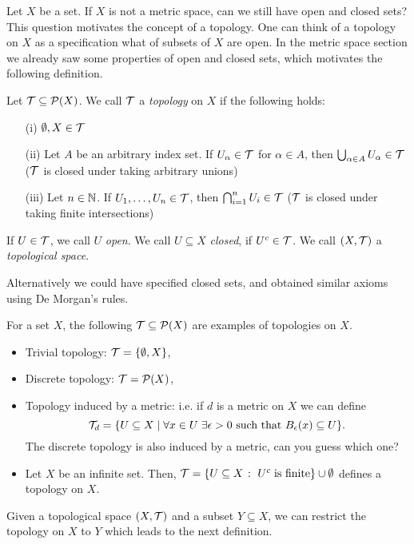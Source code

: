 \documentclass{article}
\begin{document}
Let $X$ be a set. If $X$ is not a metric space, can we still have open and closed sets? This question motivates the concept of a topology. One can think of a topology on $X$ as a specification what of subsets of $X$ are open. In the metric space section we already saw some properties of open and closed sets, which motivates the following definition. 

\begin{definition}
Let $\mathcal{T}\subseteq \mathcal{P}(X)$. We call $\mathcal{T}$ a \emph{topology} on $X$ if the following holds:
\begin{itemize}
    \item[(i)] $\emptyset, X \in \mathcal{T}$
    \item[(ii)] Let $A$ be an arbitrary index set. If $U_\alpha \in \mathcal{T}$ for $\alpha\in A$, then $\bigcup_{\alpha \in A} U_\alpha \in \mathcal{T}$ ($\mathcal{T}$ is closed under taking arbitrary unions)
    \item[(iii)] Let $n \in {\mathbb{N}}$. If $U_1, \ldots, U_n \in \mathcal{T}$, then $\bigcap_{i=1}^n U_i \in \mathcal{T}$ ($\mathcal{T}$ is closed under taking finite intersections)
\end{itemize}
If $U\in \mathcal{T}$, we call $U$ \emph{open}. We call $U\subseteq X$ \emph{closed}, if $U^c\in \mathcal{T}$. We call $(X,\mathcal{T})$ a \emph{topological space}.
\end{definition}

Alternatively we could have specified closed sets, and obtained similar axioms using De Morgan's rules. 

\begin{example}
For a set $X$, the following $\mathcal{T} \subseteq \mathcal{P}(X)$ are examples of topologies on $X$.
\begin{itemize}
    \item Trivial topology: $\mathcal{T} = \{\emptyset, X\}$,
    \item Discrete topology: $\mathcal{T}=\mathcal{P}(X)$,
    \item Topology induced by a metric: i.e. if $d$ is a metric on $X$ we can define 
    $$\mathcal{T}_d = \{U \subseteq X \; \vert \; \forall x \in U \; \exists \epsilon>0 \text{ such that } B_\epsilon(x) \subseteq U \}.$$
    The discrete topology is also induced by a metric, can you guess which one?
    \item Let $X$ be an infinite set. Then, $\mathcal{T} = \{U \subseteq X \;\colon\; U^c \; \text{is finite}\}\cup \emptyset$ defines a topology on $X$.
\end{itemize}
\end{example}

Given a topological space $(X,\mathcal{T})$ and a subset $Y\subseteq X$, we can restrict the topology on $X$ to $Y$ which leads to the next definition. 
\end{document}
